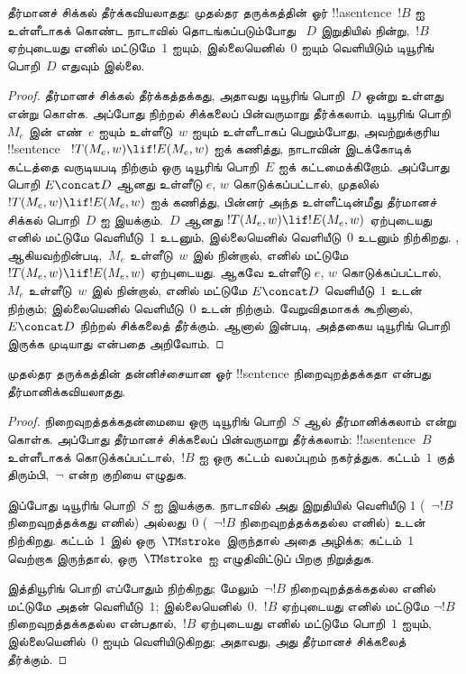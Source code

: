 \documentclass[../../../include/open-logic-section]{subfiles}
\begin{document}


\begin{thm}
தீர்மானச் சிக்கல் தீர்க்கவியலாதது: முதல்தர தருக்கத்தின் ஓர்
!!a{sentence}~$!B$ ஐ உள்ளீடாகக் கொண்ட நாடாவில் தொடங்கப்படும்போது
~$D$ இறுதியில் நின்று,~$!B$ ஏற்புடையது எனில் மட்டுமே~$1$ ஐயும்,
இல்லையெனில்~$0$ ஐயும் வெளியிடும் டியூரிங் பொறி~$D$ எதுவும் இல்லை.
\end{thm}

\begin{proof}
தீர்மானச் சிக்கல் தீர்க்கத்தக்கது, அதாவது டியூரிங் பொறி~$D$ ஒன்று
உள்ளது என்று கொள்க. அப்போது நிற்றல் சிக்கலைப் பின்வருமாறு தீர்க்கலாம்.
டியூரிங் பொறி~$M_e$ இன் எண்~$e$ ஐயும் உள்ளீடு~$w$ ஐயும் உள்ளீடாகப்
பெறும்போது, அவற்றுக்குரிய !!{sentence}
~$!T(M_e, w) \lif !E(M_e, w)$ ஐக் கணித்து, நாடாவின் இடக்கோடிக்
கட்டத்தை வருடியபடி நிற்கும் ஒரு டியூரிங் பொறி~$E$ ஐக் கட்டமைக்கிறோம்.
அப்போது பொறி $E \concat D$ ஆனது உள்ளீடு $e$, $w$ கொடுக்கப்பட்டால்,
முதலில்~$!T(M_e, w) \lif !E(M_e, w)$ ஐக் கணித்து, பின்னர் அந்த
உள்ளீட்டின்மீது தீர்மானச் சிக்கல் பொறி~$D$ ஐ இயக்கும்.~$D$ ஆனது
$!T(M_e, w) \lif !E(M_e, w)$ ஏற்புடையது எனில் மட்டுமே வெளியீடு~$1$
உடனும், இல்லையெனில் வெளியீடு~$0$ உடனும் நிற்கிறது.
, 
ஆகியவற்றின்படி,~$M_e$ உள்ளீடு~$w$ இல் நின்றால், எனில் மட்டுமே
$!T(M_e, w) \lif !E(M_e, w)$ ஏற்புடையது. ஆகவே உள்ளீடு $e$, $w$
கொடுக்கப்பட்டால்,~$M_e$ உள்ளீடு~$w$ இல் நின்றால், எனில் மட்டுமே
$E\concat D$ வெளியீடு~$1$ உடன் நிற்கும்; இல்லையெனில் வெளியீடு~$0$
உடன் நிற்கும். வேறுவிதமாகக் கூறினால், $E \concat D$ நிற்றல்
சிக்கலைத் தீர்க்கும். ஆனால்  இன்படி,
அத்தகைய டியூரிங் பொறி இருக்க முடியாது என்பதை அறிவோம்.
\end{proof}

\begin{cor}%
முதல்தர தருக்கத்தின் தன்னிச்சையான ஓர் !!{sentence}
நிறைவுறத்தக்கதா என்பது தீர்மானிக்கவியலாதது.
\end{cor}

\begin{proof}
  நிறைவுறத்தக்கதன்மையை ஒரு டியூரிங் பொறி~$S$ ஆல் தீர்மானிக்கலாம்
  என்று கொள்க. அப்போது தீர்மானச் சிக்கலைப் பின்வருமாறு தீர்க்கலாம்:
  !!a{sentence}~$B$ உள்ளீடாகக் கொடுக்கப்பட்டால்,~$!B$ ஐ ஒரு கட்டம்
  வலப்புறம் நகர்த்துக. கட்டம்~$1$ குத் திரும்பி,~$\lnot$ என்ற
  குறியை எழுதுக.

  இப்போது டியூரிங் பொறி~$S$ ஐ இயக்குக. நாடாவில் அது இறுதியில்
  வெளியீடு $1$ (~$\lnot !B$ நிறைவுறத்தக்கது எனில்) அல்லது~$0$
  (~$\lnot !B$ நிறைவுறத்தக்கதல்ல எனில்) உடன் நிற்கிறது.
  கட்டம்~$1$ இல் ஒரு~$\TMstroke$ இருந்தால் அதை அழிக்க; கட்டம்~$1$
  வெற்றாக இருந்தால், ஒரு~$\TMstroke$ ஐ எழுதிவிட்டுப் பிறகு நிறுத்துக.

  இத்தியூரிங் பொறி எப்போதும் நிற்கிறது; மேலும்~$\lnot
  !B$ நிறைவுறத்தக்கதல்ல எனில் மட்டுமே அதன் வெளியீடு~$1$;
  இல்லையெனில்~$0$.~$!B$ ஏற்புடையது எனில் மட்டுமே
  $\lnot !B$ நிறைவுறத்தக்கதல்ல என்பதால்,~$!B$ ஏற்புடையது எனில்
  மட்டுமே பொறி~$1$ ஐயும், இல்லையெனில்~$0$ ஐயும் வெளியிடுகிறது;
  அதாவது, அது தீர்மானச் சிக்கலைத் தீர்க்கும்.
\end{proof}
\end{document}
